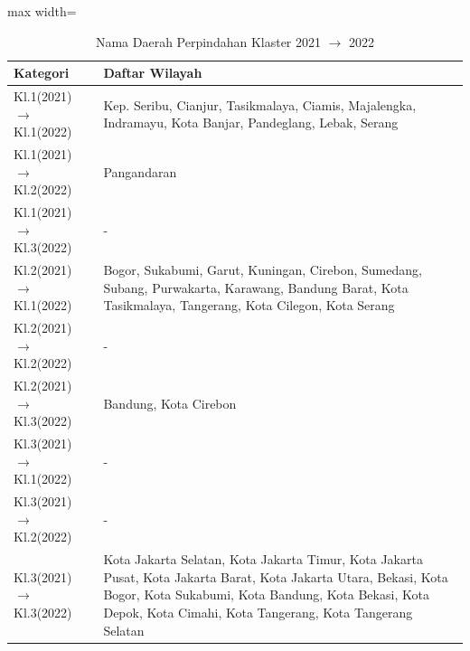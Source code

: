 \begin{table}[H]
\centering
\caption{Nama Daerah Perpindahan Klaster 2021 \(\rightarrow\) 2022} \label{tab:transname2021x2022}
\begin{adjustbox}{max width=\textwidth}
\begin{tabular}{|p{4cm}|p{10cm}|}
\hline
\textbf{Kategori} & \textbf{Daftar Wilayah} \\
\hline
Kl.1(2021) \(\rightarrow\) Kl.1(2022) & Kep. Seribu, Cianjur, Tasikmalaya, Ciamis, Majalengka, Indramayu, Kota Banjar, Pandeglang, Lebak, Serang \\
\hline
Kl.1(2021) \(\rightarrow\) Kl.2(2022) & Pangandaran \\
\hline
Kl.1(2021) \(\rightarrow\) Kl.3(2022) & - \\
\hline
Kl.2(2021) \(\rightarrow\) Kl.1(2022) & Bogor, Sukabumi, Garut, Kuningan, Cirebon, Sumedang, Subang, Purwakarta, Karawang, Bandung Barat, Kota Tasikmalaya, Tangerang, Kota Cilegon, Kota Serang \\
\hline
Kl.2(2021) \(\rightarrow\) Kl.2(2022) & - \\
\hline
Kl.2(2021) \(\rightarrow\) Kl.3(2022) & Bandung, Kota Cirebon \\
\hline
Kl.3(2021) \(\rightarrow\) Kl.1(2022) & - \\
\hline
Kl.3(2021) \(\rightarrow\) Kl.2(2022) & - \\
\hline
Kl.3(2021) \(\rightarrow\) Kl.3(2022) & Kota Jakarta Selatan, Kota Jakarta Timur, Kota Jakarta Pusat, Kota Jakarta Barat, Kota Jakarta Utara, Bekasi, Kota Bogor, Kota Sukabumi, Kota Bandung, Kota Bekasi, Kota Depok, Kota Cimahi, Kota Tangerang, Kota Tangerang Selatan \\
\hline
\end{tabular}
\end{adjustbox}
\end{table}